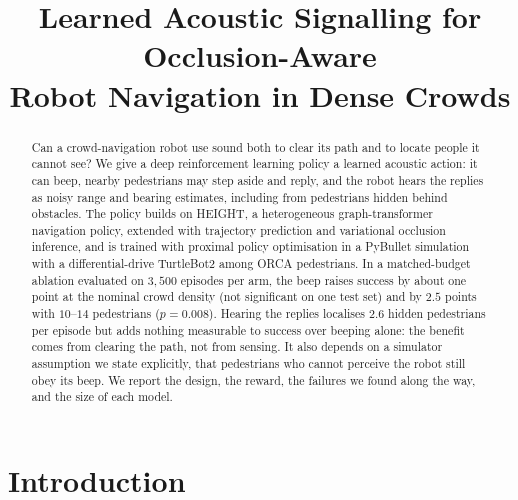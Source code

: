 \documentclass[conference]{IEEEtran}
\begin{document}
\title{Learned Acoustic Signalling for Occlusion-Aware\\
Robot Navigation in Dense Crowds}

\author{
}

\maketitle

\begin{abstract}
Can a crowd-navigation robot use sound both to clear its path and to locate people it cannot
see? We give a deep reinforcement learning policy a learned acoustic action: it can beep, nearby
pedestrians may step aside and reply, and the robot hears the replies as noisy range and bearing
estimates, including from pedestrians hidden behind obstacles. The policy builds on HEIGHT, a
heterogeneous graph-transformer navigation policy, extended with trajectory prediction and
variational occlusion inference, and is trained with proximal policy optimisation in a PyBullet
simulation with a differential-drive TurtleBot2 among ORCA pedestrians. In a matched-budget
ablation evaluated on $3{,}500$ episodes per arm, the beep raises success by about one point at
the nominal crowd density (not significant on one test set) and by $2.5$ points with $10$--$14$
pedestrians ($p=0.008$). Hearing the replies localises $2.6$ hidden pedestrians per episode but
adds nothing measurable to success over beeping alone: the benefit comes from clearing the path,
not from sensing. It also depends on a simulator assumption we state explicitly, that
pedestrians who cannot perceive the robot still obey its beep. We report the design, the reward,
the failures we found along the way, and the size of each model.
\end{abstract}

\section{Introduction}
\end{document}
